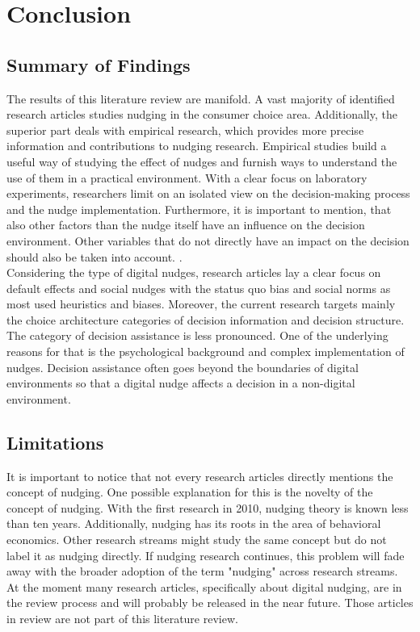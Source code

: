 \section{Conclusion}

 \subsection{Summary of Findings}
The results of this literature review are manifold. A vast majority of identified research articles studies nudging in the consumer choice area. Additionally, the superior part deals with empirical research, which provides more precise information and contributions to nudging research. Empirical studies build a useful way of studying the effect of nudges and furnish ways to understand the use of them in a practical environment. With a clear focus on laboratory experiments, researchers limit on an isolated view on the decision-making process and the nudge implementation. Furthermore, it is important to mention, that also other factors than the nudge itself have an influence on the decision environment. Other variables that do not directly have an impact on the decision should also be taken into account. \cite{biswas_shining_2017}.
\\

Considering the type of digital nudges, research articles lay a clear focus on default effects and social nudges with the status quo bias and social norms as most used heuristics and biases. Moreover, the current research targets mainly the choice architecture categories of decision information and decision structure. The category of decision assistance is less pronounced. One of the underlying reasons for that is the psychological background and complex implementation of nudges. Decision assistance often goes beyond the boundaries of digital environments so that a digital nudge affects a decision in a non-digital environment. 
 
\subsection{Limitations}
It is important to notice that not every research articles directly mentions the concept of nudging. One possible explanation for this is the novelty of the concept of nudging. With the first research in 2010, nudging theory is known less than ten years. Additionally, nudging has its roots in the area of behavioral economics. Other research streams might study the same concept but do not label it as nudging directly. If nudging research continues, this problem will fade away with the broader adoption of the term "nudging" across research streams. At the moment many research articles, specifically about digital nudging, are in the review process and will probably be released in the near future. Those articles in review are not part of this literature review. %
\\

